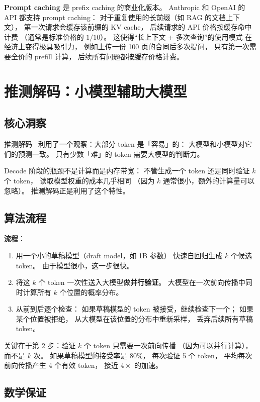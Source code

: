 \textbf{Prompt caching} 是 prefix caching 的商业化版本。
Anthropic 和 OpenAI 的 API 都支持 prompt caching：
对于重复使用的长前缀（如 RAG 的文档上下文），
第一次请求会缓存该前缀的 KV cache，
后续请求的 API 价格按缓存命中计费
（通常是标准价格的 $1/10$）。
这使得“长上下文 + 多次查询”的使用模式
在经济上变得极具吸引力，
例如上传一份 100 页的合同后多次提问，
只有第一次需要全价的 prefill 计算，
后续所有问题都按缓存价格计费。


\section{推测解码：小模型辅助大模型}

\subsection{核心洞察}

推测解码~\cite{leviathan2023speculative}
利用了一个观察：大部分 token 是「容易」的：
大模型和小模型对它们的预测一致。
只有少数「难」的 token 需要大模型的判断力。

Decode 阶段的瓶颈不是计算而是内存带宽：
不管生成一个 token 还是同时验证 $k$ 个 token，
读取模型权重的成本几乎相同
（因为 $k$ 通常很小，额外的计算量可以忽略）。
推测解码正是利用了这个特性。

\subsection{算法流程}

\textbf{流程}：
\begin{enumerate}[noitemsep]
  \item 用一个小的草稿模型（draft model，如 1B 参数）
        快速自回归生成 $k$ 个候选 token。
        由于模型很小，这一步很快。
  \item 将这 $k$ 个 token 一次性送入大模型做\textbf{并行验证}。
        大模型在一次前向传播中同时计算所有 $k$ 个位置的概率分布。
  \item 从前到后逐个检查：
        如果草稿模型的 token 被接受，继续检查下一个；
        如果某个位置被拒绝，
        从大模型在该位置的分布中重新采样，
        丢弃后续所有草稿 token。
\end{enumerate}

关键在于第 2 步：验证 $k$ 个 token 只需要一次前向传播
（因为可以并行计算），而不是 $k$ 次。
如果草稿模型的接受率是 80\%，
每次验证 5 个 token，
平均每次前向传播产生 4 个有效 token，
接近 $4\times$ 的加速。

\subsection{数学保证}

